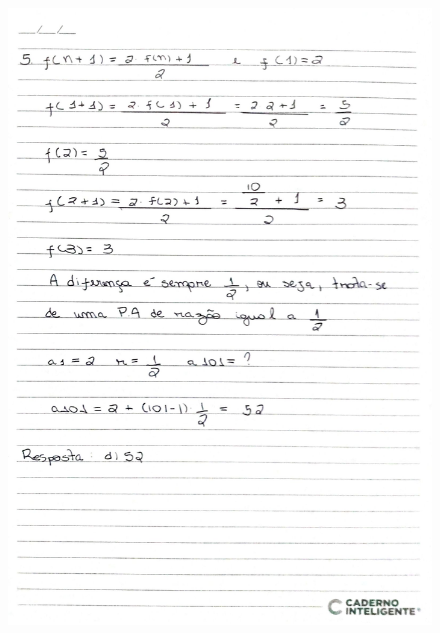 \documentclass[
  12pt,     %
  openright,      %
  oneside,      %
  a4paper     %
  ]{abntex2}
\begin{document}
\begin{figure}[H]
  \centering
  \includegraphics[scale=0.23]{pagina13.jpg}
\end{figure}
\end{document}
